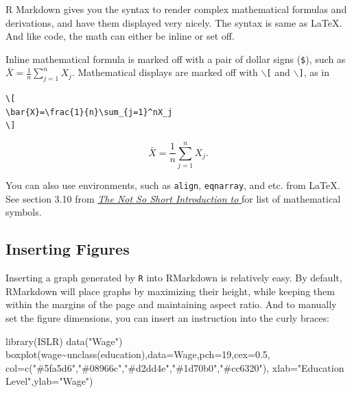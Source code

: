 \documentclass[
  11pt,
]{article}
\newenvironment{Shaded}{\begin{snugshade}}{\end{snugshade}}
\newcommand{\AttributeTok}[1]{\textcolor[rgb]{0.77,0.63,0.00}{#1}}
\newcommand{\DecValTok}[1]{\textcolor[rgb]{0.00,0.00,0.81}{#1}}
\newcommand{\FloatTok}[1]{\textcolor[rgb]{0.00,0.00,0.81}{#1}}
\newcommand{\FunctionTok}[1]{\textcolor[rgb]{0.00,0.00,0.00}{#1}}
\newcommand{\NormalTok}[1]{#1}
\newcommand{\SpecialCharTok}[1]{\textcolor[rgb]{0.00,0.00,0.00}{#1}}
\newcommand{\StringTok}[1]{\textcolor[rgb]{0.31,0.60,0.02}{#1}}
\begin{document}
R Markdown gives you the syntax to render complex mathematical formulas
and derivations, and have them displayed very nicely. The syntax is same
as \LaTeX. And like code, the math can either be inline or set off.

Inline mathematical formula is marked off with a pair of dollar signs
(\texttt{\$}), such as \(\bar{X}=\frac{1}{n}\sum_{j=1}^nX_j\).
Mathematical displays are marked off with \texttt{$\backslash$[} and
\texttt{$\backslash$]}, as in

\begin{verbatim}
\[
\bar{X}=\frac{1}{n}\sum_{j=1}^nX_j
\]
\end{verbatim}

\[
\bar{X}=\frac{1}{n}\sum_{j=1}^nX_j.
\]

You can also use environments, such as \texttt{align},
\texttt{eqnarray}, and etc. from \LaTeX. See section 3.10 from
\href{https://mirror.las.iastate.edu/tex-archive/info/lshort/english/lshort.pdf}{\emph{The
Not So Short Introduction to \LaTeXe}} for list of mathematical symbols.

\hypertarget{inserting-figures}{%
\subsection{Inserting Figures}\label{inserting-figures}}

Inserting a graph generated by \texttt{R} into RMarkdown is relatively
easy. By default, RMarkdown will place graphs by maximizing their
height, while keeping them within the margins of the page and
maintaining aspect ratio. And to manually set the figure dimensions, you
can insert an instruction into the curly braces:

\begin{Shaded}
\begin{Highlighting}[]
\FunctionTok{library}\NormalTok{(ISLR) }
\FunctionTok{data}\NormalTok{(}\StringTok{"Wage"}\NormalTok{) }
\FunctionTok{boxplot}\NormalTok{(wage}\SpecialCharTok{\textasciitilde{}}\FunctionTok{unclass}\NormalTok{(education),}\AttributeTok{data=}\NormalTok{Wage,}\AttributeTok{pch=}\DecValTok{19}\NormalTok{,}\AttributeTok{cex=}\FloatTok{0.5}\NormalTok{,}
        \AttributeTok{col=}\FunctionTok{c}\NormalTok{(}\StringTok{"\#5fa5d6"}\NormalTok{,}\StringTok{"\#08966c"}\NormalTok{,}\StringTok{"\#d2dd4e"}\NormalTok{,}\StringTok{"\#1d70b0"}\NormalTok{,}\StringTok{"\#cc6320"}\NormalTok{),}
        \AttributeTok{xlab=}\StringTok{"Education Level"}\NormalTok{,}\AttributeTok{ylab=}\StringTok{"Wage"}\NormalTok{)}
\end{Highlighting}
\end{Shaded}
\end{document}

